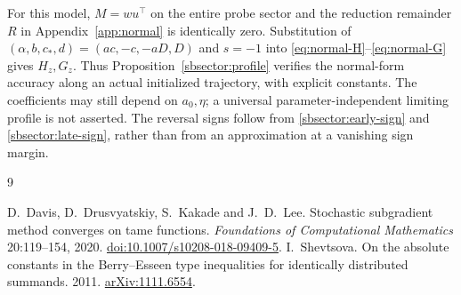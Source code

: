 \documentclass[10pt]{article}
\theoremstyle{remark}\newtheorem{remark}[theorem]{Remark}
\begin{document}
For this model, $M=wu^\top$ on the entire probe sector and the reduction
remainder $R$ in Appendix~\ref{app:normal} is identically zero. Substitution
of $(\alpha,b,c_*,d)=(ac,-c,-aD,D)$ and $s=-1$ into
\eqref{eq:normal-H}--\eqref{eq:normal-G} gives $H_z,G_z$.
Thus Proposition~\ref{sbsector:profile} verifies the normal-form accuracy
along an actual initialized trajectory, with explicit constants.
The coefficients may still depend on $a_0,\eta$; a universal
parameter-independent limiting profile is not asserted. The reversal
signs follow from \eqref{sbsector:early-sign} and
\eqref{sbsector:late-sign}, rather than from an approximation at a
vanishing sign margin.

\begin{thebibliography}{9}
\raggedright
{} D.~Davis, D.~Drusvyatskiy, S.~Kakade and J.~D.~Lee.
Stochastic subgradient method converges on tame functions.
\emph{Foundations of Computational Mathematics} 20:119--154, 2020.
\href{https://doi.org/10.1007/s10208-018-09409-5}{doi:10.1007/s10208-018-09409-5}.
 I.~Shevtsova.
On the absolute constants in the Berry--Esseen type inequalities for
identically distributed summands. 2011.
\href{https://arxiv.org/abs/1111.6554}{arXiv:1111.6554}.
\end{thebibliography}
\end{document}
